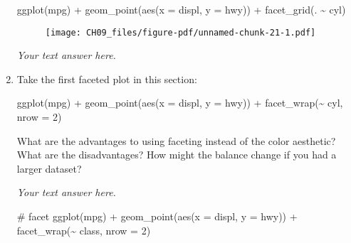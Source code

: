 \documentclass[
  letterpaper,
  DIV=11,
  numbers=noendperiod]{scrreprt}
\newenvironment{Shaded}{\begin{snugshade}}{\end{snugshade}}
\newcommand{\AttributeTok}[1]{\textcolor[rgb]{0.40,0.45,0.13}{#1}}
\newcommand{\CommentTok}[1]{\textcolor[rgb]{0.37,0.37,0.37}{#1}}
\newcommand{\DecValTok}[1]{\textcolor[rgb]{0.68,0.00,0.00}{#1}}
\newcommand{\FunctionTok}[1]{\textcolor[rgb]{0.28,0.35,0.67}{#1}}
\newcommand{\NormalTok}[1]{\textcolor[rgb]{0.00,0.23,0.31}{#1}}
\newcommand{\SpecialCharTok}[1]{\textcolor[rgb]{0.37,0.37,0.37}{#1}}
\begin{document}
\begin{enumerate}
\begin{tcolorbox}
\begin{Shaded}
\begin{Highlighting}[]
\FunctionTok{ggplot}\NormalTok{(mpg) }\SpecialCharTok{+} 
  \FunctionTok{geom\_point}\NormalTok{(}\FunctionTok{aes}\NormalTok{(}\AttributeTok{x =}\NormalTok{ displ, }\AttributeTok{y =}\NormalTok{ hwy)) }\SpecialCharTok{+}
  \FunctionTok{facet\_grid}\NormalTok{(. }\SpecialCharTok{\textasciitilde{}}\NormalTok{ cyl)}
\end{Highlighting}
\end{Shaded}

  \begin{figure}[H]

  {\centering \texttt{[image: CH09\_files/figure-pdf/unnamed-chunk-21-1.pdf]}

  }

  \end{figure}

  \emph{Your text answer here.}

  \end{tcolorbox}
\item
  Take the first faceted plot in this section:

\begin{Shaded}
\begin{Highlighting}[]
\FunctionTok{ggplot}\NormalTok{(mpg) }\SpecialCharTok{+} 
  \FunctionTok{geom\_point}\NormalTok{(}\FunctionTok{aes}\NormalTok{(}\AttributeTok{x =}\NormalTok{ displ, }\AttributeTok{y =}\NormalTok{ hwy)) }\SpecialCharTok{+} 
  \FunctionTok{facet\_wrap}\NormalTok{(}\SpecialCharTok{\textasciitilde{}}\NormalTok{ cyl, }\AttributeTok{nrow =} \DecValTok{2}\NormalTok{)}
\end{Highlighting}
\end{Shaded}

  What are the advantages to using faceting instead of the color
  aesthetic? What are the disadvantages? How might the balance change if
  you had a larger dataset?

  \begin{tcolorbox}[enhanced jigsaw, breakable, bottomtitle=1mm, left=2mm, colback=white, toprule=.15mm, leftrule=.75mm, colframe=quarto-callout-note-color-frame, colbacktitle=quarto-callout-note-color!10!white, title={Answer}, coltitle=black, toptitle=1mm, bottomrule=.15mm, opacitybacktitle=0.6, arc=.35mm, rightrule=.15mm, titlerule=0mm, opacityback=0]

  \emph{Your text answer here.}

\begin{Shaded}
\begin{Highlighting}[]
\CommentTok{\# facet}
\FunctionTok{ggplot}\NormalTok{(mpg) }\SpecialCharTok{+} 
 \FunctionTok{geom\_point}\NormalTok{(}\FunctionTok{aes}\NormalTok{(}\AttributeTok{x =}\NormalTok{ displ, }\AttributeTok{y =}\NormalTok{ hwy)) }\SpecialCharTok{+} 
  \FunctionTok{facet\_wrap}\NormalTok{(}\SpecialCharTok{\textasciitilde{}}\NormalTok{ class, }\AttributeTok{nrow =} \DecValTok{2}\NormalTok{)}
\end{Highlighting}
\end{Shaded}


\end{tcolorbox}
\end{enumerate}
\end{document}
